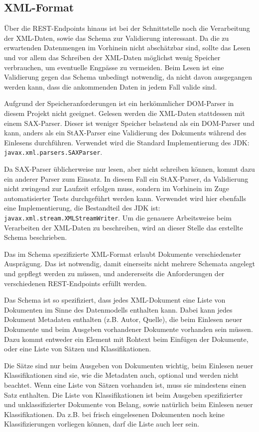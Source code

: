 \subsection{XML-Format}
Über die REST-Endpoints hinaus ist bei der Schnittstelle noch die Verarbeitung
der XML-Daten, sowie das Schema zur Validierung interessant.
Da die zu erwartenden Datenmengen im Vorhinein nicht abschätzbar sind,
sollte das Lesen und vor allem das Schreiben der XML-Daten möglichst wenig Speicher
verbrauchen, um eventuelle Engpässe zu vermeiden. Beim Lesen ist eine Validierung
gegen das Schema unbedingt notwendig, da nicht davon ausgegangen werden kann,
dass die ankommenden Daten in jedem Fall valide sind.

Aufgrund der Speicheranforderungen ist ein herkömmlicher DOM-Parser in diesem Projekt
nicht geeignet. Gelesen werden die XML-Daten stattdessen mit einem SAX-Parser\cite{insel-xml}. Dieser ist weniger Speicher belastend als ein DOM-Parser
und kann, anders als ein StAX-Parser eine Validierung des Dokuments während
des Einlesens durchführen. Verwendet wird die Standard Implementierung
des JDK: \texttt{javax.xml.parsers.SAXParser}.

Da SAX-Parser üblicherweise nur lesen, aber nicht schreiben können, kommt dazu ein
anderer Parser zum Einsatz. In diesem Fall ein StAX-Parser,
da Validierung nicht zwingend zur Laufzeit erfolgen muss, sondern im Vorhinein
im Zuge automatisierter Tests durchgeführt werden kann.
Verwendet wird hier ebenfalls eine Implementierung, die Bestandteil des JDK ist:
\texttt{javax.xml.stream.XMLStreamWriter}.
Um die genauere Arbeitsweise beim Verarbeiten der XML-Daten zu beschreiben,
wird an dieser Stelle das erstellte Schema beschrieben.

Das im Schema spezifizierte XML-Format erlaubt Dokumente verschiedenster Ausprägung.
Das ist notwendig, damit einerseits nicht mehrere Schemata angelegt und gepflegt
werden zu müssen, und andererseits die Anforderungen der verschiedenen
REST-Endpoints erfüllt werden.

Das Schema ist so spezifiziert, dass jedes XML-Dokument eine Liste von Dokumenten
im Sinne des Datenmodells enthalten kann.
Dabei kann jedes Dokument Metadaten enthalten (z.B. Autor, Quelle), die beim Einlesen
neuer Dokumente und beim Ausgeben vorhandener Dokumente vorhanden sein müssen.
Dazu kommt entweder ein Element mit Rohtext beim Einfügen der Dokumente,
oder eine Liste von Sätzen und Klassifikationen.

Die Sätze sind nur beim Ausgeben von Dokumenten wichtig, beim Einlesen
neuer Klassifikationen sind sie, wie die Metadaten auch,
optional und werden nicht beachtet.
Wenn eine Liste von Sätzen vorhanden ist, muss sie mindestens einen Satz enthalten.
Die Liste von Klassifikationen ist beim Ausgeben spezifizierter
und unklassifizierter Dokumente von Belang, sowie natürlich
beim Einlesen neuer Klassifikationen. Da z.B. bei frisch eingelesenen Dokumenten noch keine Klassifizierungen vorliegen können, darf die Liste auch leer sein.

